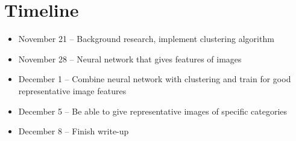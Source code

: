 \documentclass{article}
\begin{document}
\section{Timeline}
\begin{itemize}
\item November 21 -- Background research, implement clustering algorithm
\item November 28 -- Neural network that gives features of images
\item December 1 -- Combine neural network with clustering and train for good representative image features
\item December 5 -- Be able to give representative images of specific categories
\item December 8 -- Finish write-up
\end{itemize}
\end{document}
